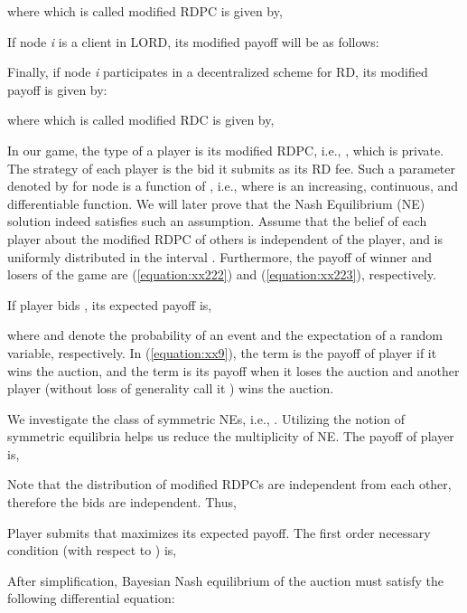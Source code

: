 \documentclass[journal,12pt, onecolumn]{IEEEtran}
\begin{document}
where  which is called modified RDPC is given by,

If node \textit{i} is a client in LORD, its modified payoff will be as follows:

Finally, if node \textit{i} participates in a decentralized scheme for RD, its modified payoff is given by:

where  which is called modified RDC is given by,


In our game, the type of a player is its modified RDPC, i.e., , which is private. The strategy of each player is the bid it submits as its RD fee. Such a parameter denoted by  for node  is a function of , i.e.,  where  is an increasing, continuous, and differentiable function. We will later prove that the Nash Equilibrium (NE) solution indeed satisfies such an assumption. Assume that the belief of each player about the modified RDPC of others is independent of the player, and is  uniformly distributed in the interval . Furthermore, the payoff of winner and losers of the game are (\ref{equation:xx222}) and (\ref{equation:xx223}), respectively. 

If player  bids , its expected payoff is,

\begin{small}

\end{small}
where  and  denote the probability of an event and the expectation of a random variable, respectively. In (\ref{equation:xx9}), the term  is the payoff of player  if it wins the auction, and the term  is its payoff when it loses the auction and another player (without loss of generality call it ) wins the auction. 

We investigate the class of symmetric NEs, i.e., . Utilizing the notion of symmetric equilibria helps us reduce the multiplicity of NE. The payoff of player  is,

\vspace*{-3mm}
\begin{small}

\end{small}

Note that the distribution of modified RDPCs are independent from each other, therefore the bids are independent. Thus,


Player  submits  that maximizes its expected payoff. The first order necessary condition (with respect to ) is,


After simplification, Bayesian Nash equilibrium of the auction must satisfy the following differential equation:
\end{document}
